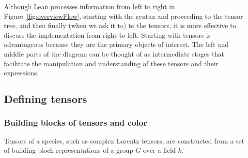 \documentclass[a4paper, 11pt]{article}
\begin{document}
Although Lean processes information from left to right in Figure~\ref{fig:overviewFlow}, 
starting with the syntax and proceeding to the tensor tree, and then finally (when 
we ask it to) to the tensors, 
it is more effective to discuss the implementation from right to left. 
Starting with tensors is advantageous because they are the primary objects of interest.
 The left and middle parts of the diagram can be thought of as intermediate stages that facilitate the 
 manipulation and understanding of these tensors and their expressions.

\subsection{Defining tensors} \label{sec:definingTensors}

\subsubsection{Building blocks of tensors and color} \label{sec:buildingBlocks}

Tensors of a species, such as complex Lorentz tensors, are constructed from a 
set of building block representations of a group $G$ over a field $k$.
\end{document}
